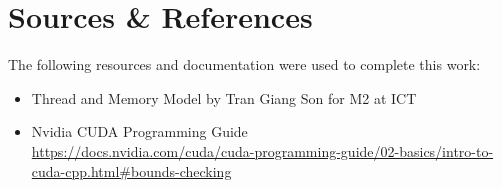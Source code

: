 \documentclass[11pt, a4paper]{article}
\begin{document}
\section{Sources \& References}
The following resources and documentation were used to complete this work:

\begin{itemize}
    \item Thread and Memory Model by Tran Giang Son for M2 at ICT\\
    \item Nvidia CUDA Programming Guide \\
    \url{https://docs.nvidia.com/cuda/cuda-programming-guide/02-basics/intro-to-cuda-cpp.html#bounds-checking}
\end{itemize}
\end{document}
